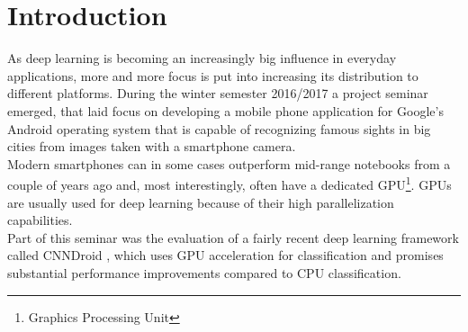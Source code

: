 \section{Introduction}
As deep learning is becoming an increasingly big influence in everyday applications, more and more focus is put into increasing its distribution to different platforms. During the winter semester 2016/2017 a project seminar emerged, that laid focus on developing a mobile phone application for Google's Android operating system that is capable of recognizing famous sights in big cities from images taken with a smartphone camera.\\
Modern smartphones can in some cases outperform mid-range notebooks from a couple of years ago and, most interestingly, often have a dedicated GPU\footnote{Graphics Processing Unit}. GPUs are usually used for deep learning because of their high parallelization capabilities.\\
Part of this seminar was the evaluation of a fairly recent deep learning framework called CNNDroid \cite{cnndroid2016}, which uses GPU acceleration for classification and promises substantial performance improvements compared to CPU classification.